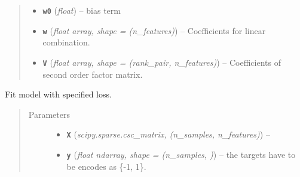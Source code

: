 \documentclass[letterpaper,10pt,english]{sphinxmanual}
\begin{document}
\begin{fulllineitems}
\begin{quote}
\begin{description}
\begin{itemize}
\item {} 
\textbf{\texttt{w0}} (\emph{float}) -- bias term

\item {} 
\textbf{\texttt{w}} (\emph{float \textbar{} array, shape = (n\_features)}) -- Coefficients for linear combination.

\item {} 
\textbf{\texttt{V}} (\emph{float \textbar{} array, shape = (rank\_pair, n\_features)}) -- Coefficients of second order factor matrix.

\end{itemize}

\end{description}\end{quote}

\begin{fulllineitems}
\label{api:fastFM.sgd.FMClassification.fit}
Fit model with specified loss.
\begin{quote}\begin{description}
\item[{Parameters}] \leavevmode\begin{itemize}
\item {} 
\textbf{\texttt{X}} (\emph{scipy.sparse.csc\_matrix, (n\_samples, n\_features)}) -- 

\item {} 
\textbf{\texttt{y}} (\emph{float \textbar{} ndarray, shape = (n\_samples, )}) -- the targets have to be encodes as \{-1, 1\}.

\end{itemize}

\end{description}\end{quote}

\end{fulllineitems}


\end{fulllineitems}

\end{document}
